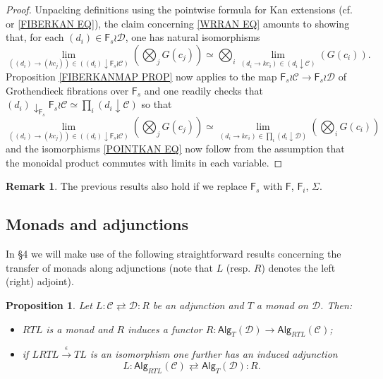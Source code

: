 \documentclass[a4paper,10pt
,draft
]{article}%
\numberwithin{equation}{section}
\numberwithin{figure}{section}
\newtheorem{proposition}[equation]{Proposition}%
\theoremstyle{definition} %
\newtheorem{remark}[equation]{Remark}%
\newcommand{\Fin}{\mathsf{F}}%
\newcommand{\C}{\ensuremath{\mathcal C}}
\newcommand{\1}{\ensuremath{\mathbbm 1}}%
\begin{document}
\begin{proof}
	Unpacking definitions using the pointwise formula for Kan extensions (cf. \cite[X.3 Thm. 1]{McL} or \eqref{FIBERKAN EQ}), the claim concerning \eqref{WRRAN EQ} amounts to showing that,
	for each $(d_i) \in \Fin_s \wr \mathcal{D}$,
	one has natural isomorphisms
	\begin{equation}\label{POINTKAN EQ}
	\underset{((d_i) \to (kc_j))\in
	\left( (d_i) \downarrow \Fin_s \wr \C \right) }{\lim} {\left(\bigotimes_j{G(c_j)}\right)}
		\simeq	
	\bigotimes_i \underset{(d_i  \to kc_i) \in 
		(d_i \downarrow \C)}{\lim}
	\left(G(c_i)\right).
	\end{equation}
Proposition \ref{FIBERKANMAP PROP} now applies to 
the map $\Fin_s \wr \mathcal{C} \to \Fin_s \wr \mathcal{D}$ of Grothendieck fibrations over $\Fin_s$ and one readily checks that
$(d_i)\downarrow_{\Fin_s} \Fin_s \wr \mathcal{C} \simeq
\prod_{i}{(d_i\downarrow \mathcal{C})}
$
so that 
	\[
	\underset{((d_i) \to (kc_j))\in
	\left( (d_i)\downarrow \Fin_s \wr \C \right) }{\lim} {\left(\bigotimes_j{G(c_j)}\right)}
		\simeq	
	\underset{(d_i \to kc_i)\in
	\prod_{i} \left( {d_i \downarrow \mathcal{D}} \right)}{\lim}
	\left(\bigotimes_i{G(c_i)}\right)
	\]
and the isomorphisms \eqref{POINTKAN EQ} now follow from the assumption that the monoidal product commutes with limits in each variable.
\end{proof}

\begin{remark}
      The previous results also hold if we replace $\Fin_s$ with $\Fin$, $\Fin_i$, $\Sigma$.
\end{remark}

\subsection{Monads and adjunctions}


In \S 4 we will make use of the following straightforward results concerning the transfer of monads along adjunctions
(note that $L$ (resp. $R$) denotes the left (right) adjoint).


\begin{proposition}\label{MONADADJ1 PROP}
Let
$
L \colon \mathcal{C} \rightleftarrows \mathcal{D} \colon R
$
be an adjunction and $T$ a monad on $\mathcal{D}$.
Then:
\begin{itemize}
\item[(i)] $RTL$ is a monad and $R$ induces a functor
$R \colon \mathsf{Alg}_T(\mathcal{D}) \to \mathsf{Alg}_{RTL}(\mathcal{C})$;
\item[(ii)] if $LRTL \xrightarrow{\epsilon} TL$ is an isomorphism one further has an induced adjunction
\[
L \colon \mathsf{Alg}_{RTL}(\mathcal{C})
	\rightleftarrows
\mathsf{Alg}_{T}(\mathcal{D}) \colon R.
\]
\end{itemize}
\end{proposition}
\end{document}
